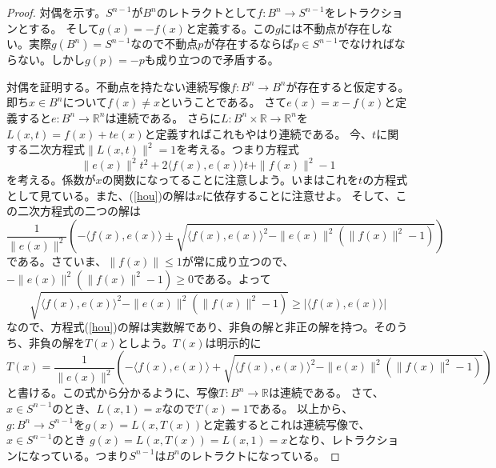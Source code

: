 \documentclass[leqno]{jsarticle}
\newcommand{\To}{\Longrightarrow}
\newcommand{\rr}{\mathbb{R}}
\begin{document}
\begin{proof}\par
[$(1)\To (2)$の証明]\par
対偶を示す。$S^{n-1}$が$B^n$のレトラクトとして$f:B^n\to S^{n-1}$をレトラクションとする。
そして$g(x)=-f(x)$と定義する。この$g$には不動点が存在しない。実際$g(B^n)=S^{n-1}$なので不動点$p$が存在するならば$p\in S^{n-1}$でなければならない。しかし$g(p)=-p$も成り立つので矛盾する。\par
[$(1)\To (2)$の証明終了]\par
[$(2)\To (1)$の証明]\par
対偶を証明する。不動点を持たない連続写像$f:B^n\to B^n$が存在すると仮定する。
即ち$x\in B^n$について$f(x)\neq x$ということである。
さて$e(x)=x-f(x)$と定義すると$e:B^n\to \rr^n$は連続である。
さらに$L:B^n\times \rr\to \rr^n$を$L(x,t)=f(x)+te(x)$と定義すればこれもやはり連続である。
今、$t$に関する二次方程式$\|L(x,t)\|^2=1$を考える。つまり方程式
\begin{equation}\label{hou}
\|e(x)\|^2t^2+2\langle f(x), e(x)\rangle t+\|f(x)\|^2-1
\end{equation}
を考える。係数が$x$の関数になってることに注意しよう。いまはこれを$t$の方程式として見ている。また、(\ref{hou})の解は$x$に依存することに注意せよ。
そして、この二次方程式の二つの解は
\[
\frac{1}{\|e(x)\|^2}\left(-\langle f(x), e(x)\rangle\pm\sqrt{\langle f(x),e(x)\rangle^2-\|e(x)\|^2(\|f(x)\|^2-1)}\right)
\]
である。さていま、$\|f(x)\|\le 1$が常に成り立つので、$-\|e(x)\|^2(\|f(x)\|^2-1)\ge 0$である。よって
\[
\sqrt{\langle f(x),e(x)\rangle^2-\|e(x)\|^2(\|f(x)\|^2-1)}\ge |\langle f(x),e(x)\rangle|
\]
なので、方程式(\ref{hou})の解は実数解であり、非負の解と非正の解を持つ。そのうち、非負の解を$T(x)$としよう。$T(x)$は明示的に
\[
T(x)=\frac{1}{\|e(x)\|^2}\left(-\langle f(x), e(x)\rangle+\sqrt{\langle f(x),e(x)\rangle^2-\|e(x)\|^2(\|f(x)\|^2-1)}\right)
\]と書ける。この式から分かるように、写像$T:B^n\to \rr$は連続である。
さて、$x\in S^{n-1}$のとき、$L(x,1)=x$なので$T(x)=1$である。
以上から、$g:B^n\to S^{n-1}$を$g(x)=L(x,T(x))$と定義するとこれは連続写像で、$x\in S^{n-1}$のとき
$g(x)=L(x,T(x))=L(x,1)=x$となり、レトラクションになっている。つまり$S^{n-1}$は$B^n$のレトラクトになっている。


\par
[$(2)\To (1)$の証明終了]
\end{proof}
\end{document}
